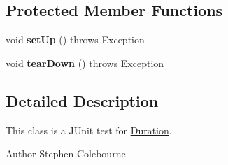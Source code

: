 \subsection*{Protected Member Functions}
\begin{DoxyCompactItemize}
\item 
\hypertarget{classorg_1_1joda_1_1time_1_1_test_duration___constructors_ac277dd20fecfd95cd2f3002954ce8591}{void {\bfseries set\-Up} ()  throws Exception }\label{classorg_1_1joda_1_1time_1_1_test_duration___constructors_ac277dd20fecfd95cd2f3002954ce8591}

\item 
\hypertarget{classorg_1_1joda_1_1time_1_1_test_duration___constructors_ab62a05c2e7ea35be6b571feb8ae5f5c9}{void {\bfseries tear\-Down} ()  throws Exception }\label{classorg_1_1joda_1_1time_1_1_test_duration___constructors_ab62a05c2e7ea35be6b571feb8ae5f5c9}

\end{DoxyCompactItemize}


\subsection{Detailed Description}
This class is a J\-Unit test for \hyperlink{classorg_1_1joda_1_1time_1_1_duration}{Duration}.

\begin{DoxyAuthor}{Author}
Stephen Colebourne 
\end{DoxyAuthor}


